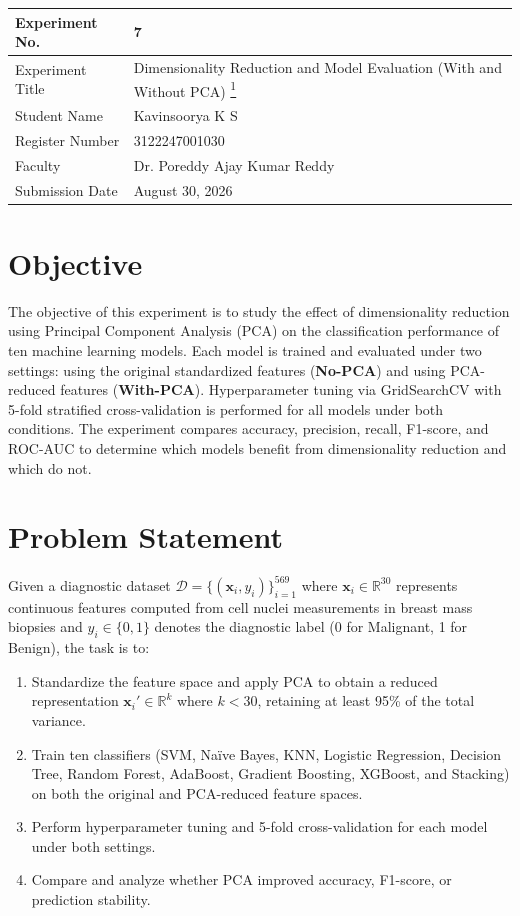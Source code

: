 \documentclass[12pt,a4paper]{article}
\begin{document}
\begin{tabular}{|p{4cm}|p{11cm}|}
\hline
Experiment No. & 7 \\ \hline
Experiment Title & Dimensionality Reduction and Model Evaluation (With and Without PCA) \href{https://github.com/Kavin-ks/Machine-Learning-Projects}{\textsuperscript{1}}\\ \hline
Student Name & Kavinsoorya K S \\ \hline
Register Number & 3122247001030 \\ \hline
Faculty & Dr. Poreddy Ajay Kumar Reddy \\ \hline
Submission Date & August 30, 2026 \\ \hline
\end{tabular}

\vspace{0.5cm}

\section{Objective}
The objective of this experiment is to study the effect of dimensionality reduction using Principal Component Analysis (PCA) on the classification performance of ten machine learning models. Each model is trained and evaluated under two settings: using the original standardized features (\textbf{No-PCA}) and using PCA-reduced features (\textbf{With-PCA}). Hyperparameter tuning via GridSearchCV with 5-fold stratified cross-validation is performed for all models under both conditions. The experiment compares accuracy, precision, recall, F1-score, and ROC-AUC to determine which models benefit from dimensionality reduction and which do not.

\section{Problem Statement}
Given a diagnostic dataset $\mathcal{D} = \{(\mathbf{x}_i, y_i)\}_{i=1}^{569}$ where $\mathbf{x}_i \in \mathbb{R}^{30}$ represents continuous features computed from cell nuclei measurements in breast mass biopsies and $y_i \in \{0, 1\}$ denotes the diagnostic label (0 for Malignant, 1 for Benign), the task is to:
\begin{enumerate}
    \item Standardize the feature space and apply PCA to obtain a reduced representation $\mathbf{x}_i' \in \mathbb{R}^{k}$ where $k < 30$, retaining at least 95\% of the total variance.
    \item Train ten classifiers (SVM, Na\"ive Bayes, KNN, Logistic Regression, Decision Tree, Random Forest, AdaBoost, Gradient Boosting, XGBoost, and Stacking) on both the original and PCA-reduced feature spaces.
    \item Perform hyperparameter tuning and 5-fold cross-validation for each model under both settings.
    \item Compare and analyze whether PCA improved accuracy, F1-score, or prediction stability.
\end{enumerate}
\end{document}
